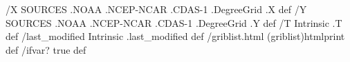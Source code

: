 \begin{ingrid}
/X SOURCES .NOAA .NCEP-NCAR .CDAS-1 .DegreeGrid .X def
/Y SOURCES .NOAA .NCEP-NCAR .CDAS-1 .DegreeGrid .Y def
/T Intrinsic .T def
/last_modified Intrinsic .last_modified def
/griblist.html { (griblist)htmlprint} def
/ifvar? true def
\end{ingrid}

